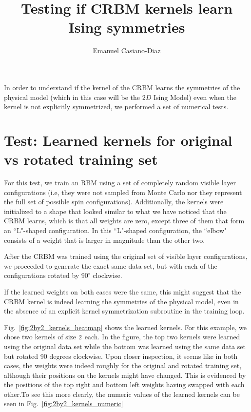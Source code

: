 \documentclass[12pt]{article}
\newcommand{\Figref}[1]{Fig.~\ref{#1}}
\begin{document}

\title{Testing if CRBM kernels learn Ising symmetries}%
\author{Emanuel Casiano-Diaz}
\maketitle

In order to understand if the kernel of the CRBM learns the symmetries of the physical model (which in this case will be the $2D$ Ising Model) even when the kernel is not explicitly symmetrized, we performed a set of numerical tests.

\section{Test: Learned kernels for original vs rotated training set}

For this test, we train an RBM using a set of completely random visible layer configurations (i.e, they were not sampled from Monte Carlo nor they represent the full set of possible spin configurations). Additionally, the kernels were initialized to a shape that looked similar to what we have noticed that the CRBM learns, which is that all weights are zero, except three of them that form an ``L"-shaped configuration. In this ``L"-shaped configuration, the ``elbow" consists of a weight that is larger in magnitude than the other two. 

After the CRBM was trained using the original set of visible layer configurations, we proceeded to generate the exact same data set, but with each of the configurations rotated by $90^\circ$ clockwise. 

If the learned weights on both cases were the same, this might suggest that the CRBM kernel is indeed learning the symmetries of the physical model, even in the absence of an explicit kernel symmetrization subroutine in the training loop.

\Figref{fig:2by2_kernels_heatmap} shows the learned kernels. For this example, we chose two kernels of size $2\time2$ each. In the figure, the top two kernels were learned using the original data set while the bottom was learned using the same data set but rotated 90 degrees clockwise. Upon closer inspection, it seems like in both cases, the weights were indeed roughly for the original and rotated training set, although their positions on the kernels might have changed. This is evidenced by the positions of the top right and bottom left weights having swapped with each other.To see this more clearly, the numeric values of the learned kernels can be seen in \Figref{fig:2by2_kernels_numeric}
\end{document}
